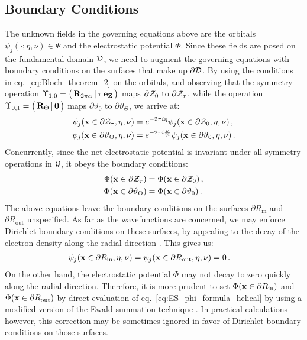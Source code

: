 \documentclass[preprint,12pt, 3p, sort&compress]{elsarticle}
\begin{document}
\subsection{Boundary Conditions}
\label{subsec:BCs}
The unknown fields in the governing equations above are the orbitals $\psi_j(\cdot;\eta,\nu) \in \Psi$ and the electrostatic potential $\Phi$. Since these fields are posed on the fundamental domain ${\cal D}$, we need to augment the governing equations with boundary conditions on the surfaces that make up $\partial {\cal D}$. By using the conditions in eq.~\ref{eq:Bloch_theorem_2} on the orbitals, and observing that the symmetry operation $\Upsilon_{1,0} = \big(\,{{\bf R}}_{2\pi\alpha} \,|\,\tau\,{\bf e}_{{\bf Z}}\,\big)$ maps $\partial{\cal Z}_{0}$ to $\partial{\cal Z}_{\tau}$, while the operation $\Upsilon_{0,1} = \big(\,{{\bf R}}_{\Theta} \,|\,\bf0\,\big)$  maps $\partial{\vartheta_0}$ to $\partial{\vartheta_{\Theta}}$, we arrive at:
\begin{align}
\psi_j({\bf x} \in \partial {\cal Z}_{\tau},\eta, \nu) &= e^{-2 \pi i \eta}\psi_j({\bf x} \in \partial {\cal Z}_{0},\eta, \nu)\,, \\
\psi_j({\bf x} \in \partial \vartheta_{\Theta},\eta, \nu) &= e^{-2 \pi i \frac{\nu}{\mathfrak{N}}}\psi_j({\bf x} \in \partial \vartheta_{0} ,\eta, \nu)\,.
\end{align}
Concurrently, since the net electrostatic potential is invariant under all symmetry operations in ${\cal G}$, it obeys the boundary conditions:
\begin{align}
\Phi({\bf x} \in \partial {\cal Z}_{\tau}) &= \Phi({\bf x} \in \partial {\cal Z}_{0})\,, \\
\Phi({\bf x} \in \partial \vartheta_{\Theta}) &= \Phi({\bf x} \in \partial \vartheta_{0})\,.
\end{align}
The above equations leave the boundary conditions on the surfaces $\partial R_{\text{in}}$ and $\partial R_{\text{out}}$ unspecified. As far as the wavefunctions are concerned, we may enforce Dirichlet boundary conditions on these surfaces, by appealing to the decay of the electron density along the radial direction \citep{banerjee2021ab, ghosh2019symmetry}. This gives us:
\begin{align}
\psi_j({\bf x} \in \partial R_{\text{in}},\eta, \nu) &= \psi_j({\bf x} \in \partial R_{\text{out}},\eta, \nu) = 0\,.
\end{align}
On the other hand, the electrostatic potential $\Phi$ may not decay to zero quickly along the radial direction. Therefore, it is more prudent to set $\Phi({\bf x} \in \partial R_{\text{in}})$ and $\Phi({\bf x} \in \partial R_{\text{out}})$ by direct evaluation of eq.~\ref{eq:ES_phi_formula_helical} by using a modified version of the Ewald summation technique \citep{Dumitrical_Ewald}. In practical calculations however, this correction may be sometimes ignored \citep{banerjee2021ab} in favor of Dirichlet boundary conditions on those surfaces. 
\end{document}
